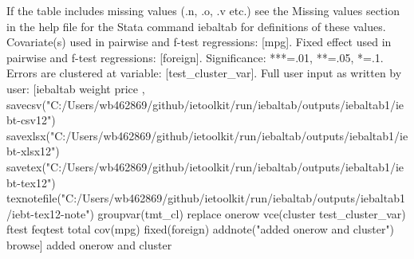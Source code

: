 If the table includes missing values (.n, .o, .v etc.) see the Missing values section in the help file for the Stata command iebaltab for definitions of these values. Covariate(s) used in pairwise and f-test regressions: [mpg]. Fixed effect used in pairwise and f-test regressions: [foreign]. Significance: ***=.01, **=.05, *=.1. Errors are clustered at variable: [test\_cluster\_var]. Full user input as written by user: [iebaltab weight price , savecsv("C:/Users/wb462869/github/ietoolkit/run/iebaltab/outputs/iebaltab1/iebt-csv12") savexlsx("C:/Users/wb462869/github/ietoolkit/run/iebaltab/outputs/iebaltab1/iebt-xlsx12") savetex("C:/Users/wb462869/github/ietoolkit/run/iebaltab/outputs/iebaltab1/iebt-tex12") texnotefile("C:/Users/wb462869/github/ietoolkit/run/iebaltab/outputs/iebaltab1/iebt-tex12-note") groupvar(tmt\_cl) replace onerow vce(cluster test\_cluster\_var) ftest feqtest total cov(mpg) fixed(foreign) addnote("added onerow and cluster") browse] added onerow and cluster
